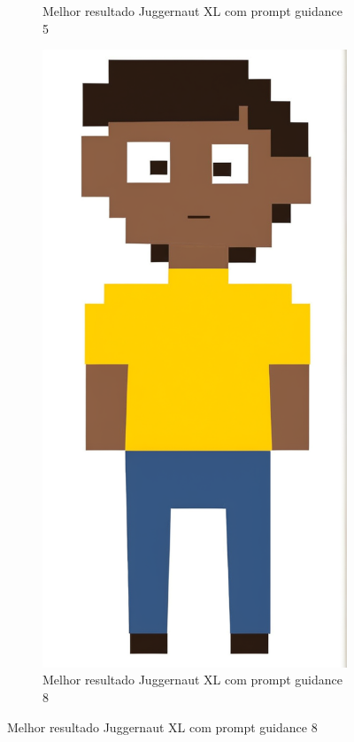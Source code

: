 \begin{figure}[htbp]
\begin{subfigure}{0.21\linewidth}
        \caption{\small Melhor resultado Juggernaut XL com prompt guidance 5}
        \label{fig:cgDreamMelhorImagemJug}
    \end{subfigure}
    \begin{subfigure}{0.21\linewidth}
        \includegraphics[width=1\linewidth]{figs/cgDream/res_img_jug8a.png}
        \caption{\small Melhor resultado Juggernaut XL com prompt guidance 8}
        \label{fig:cgDreamMelhorImagemJug8}
    \end{subfigure}

\end{figure}

